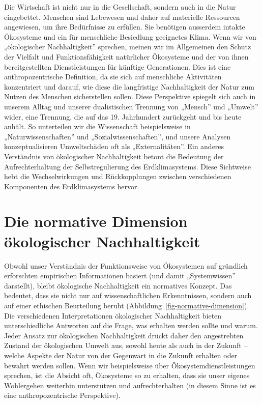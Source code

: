 \documentclass[
  nswissgerman,
  a4paper,
  openany]{book}
\begin{document}
Die Wirtschaft ist nicht nur in die Gesellschaft, sondern auch in die
Natur eingebettet. Menschen sind Lebewesen und daher auf materielle
Ressourcen angewiesen, um ihre Bedürfnisse zu erfüllen. Sie benötigen
ausserdem intakte Ökosysteme und ein für menschliche Besiedlung
geeignetes Klima. Wenn wir von „ökologischer Nachhaltigkeit'' sprechen,
meinen wir im Allgemeinen den Schutz der Vielfalt und Funktionsfähigkeit
natürlicher Ökosysteme und der von ihnen bereitgestellten
Dienstleistungen für künftige Generationen. Dies ist eine
anthropozentrische Definition, da sie sich auf menschliche Aktivitäten
konzentriert und darauf, wie diese die langfristige Nachhaltigkeit der
Natur zum Nutzen des Menschen sicherstellen sollen. Diese Perspektive
spiegelt sich auch in unserem Alltag und unserer dualistischen Trennung
von „Mensch'' und „Umwelt'' wider, eine Trennung, die auf das 19.
Jahrhundert zurückgeht und bis heute anhält. So unterteilen wir die
Wissenschaft beispielsweise in „Naturwissenschaften'' und
„Sozialwissenschaften'', und unsere Analysen konzeptualisieren
Umweltschäden oft als „Externalitäten''. Ein anderes Verständnis von
ökologischer Nachhaltigkeit betont die Bedeutung der Aufrechterhaltung
der Selbstregulierung des Erdklimasystems. Diese Sichtweise hebt die
Wechselwirkungen und Rückkopplungen zwischen verschiedenen Komponenten
des Erdklimasystems hervor.

\section{Die normative Dimension ökologischer
Nachhaltigkeit}\label{die-normative-dimension-uxf6kologischer-nachhaltigkeit}

Obwohl unser Verständnis der Funktionsweise von Ökosystemen auf
gründlich erforschten empirischen Informationen basiert (und damit
„Systemwissen'' darstellt), bleibt ökologische Nachhaltigkeit ein
normatives Konzept. Das bedeutet, dass sie nicht nur auf
wissenschaftlichen Erkenntnissen, sondern auch auf einer ethischen
Beurteilung beruht (Abbildung~\ref{fig-normative-dimension}). Die
verschiedenen Interpretationen ökologischer Nachhaltigkeit bieten
unterschiedliche Antworten auf die Frage, was erhalten werden sollte und
warum. Jeder Ansatz zur ökologischen Nachhaltigkeit drückt daher den
angestrebten Zustand der ökologischen Umwelt aus, sowohl heute als auch
in der Zukunft -- welche Aspekte der Natur von der Gegenwart in die
Zukunft erhalten oder bewahrt werden sollen. Wenn wir beispielsweise
über Ökosystemdienstleistungen sprechen, ist die Absicht oft, Ökosysteme
so zu erhalten, dass sie unser eigenes Wohlergehen weiterhin
unterstützen und aufrechterhalten (in diesem Sinne ist es eine
anthropozentrische Perspektive).
\end{document}
